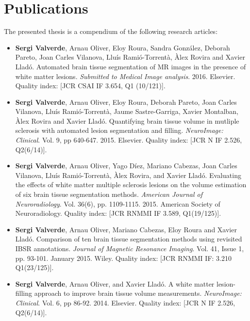 
\chapter*{Publications}


The presented thesis is a compendium of the following research articles:

\begin{itemize}

\item  \textbf{Sergi Valverde}, Arnau Oliver, Eloy Roura, Sandra Gonz\'{a}lez, Deborah Pareto, Joan Carles Vilanova, Llu\'{i}s Rami\'{o}-Torrent\`{a}, \`{A}lex Rovira and Xavier Llad\'{o}.  Automated brain tissue segmentation of MR images in the presence of white matter lesions. \textit{Submitted to Medical Image analysis}. 2016. Elsevier.  Quality index:  [JCR CSAI IF 3.654, Q1 (10/121)].

\item \textbf{Sergi Valverde}, Arnau Oliver, Eloy Roura, Deborah Pareto, Joan Carles Vilanova, Llu\'{i}s Rami\'{o}-Torrent\`{a}, Jaume Sastre-Garriga, Xavier Montalban, \`{A}lex Rovira and Xavier Llad\'{o}. Quantifying brain tissue volume in mutliple sclerosis with automated lesion segmentation and filling. \textit{NeuroImage: Clinical}. Vol. 9, pp 640-647. 2015. Elsevier.  Quality index:  [JCR N IF 2.526, Q2(6/14)].

\item  \textbf{Sergi Valverde}, Arnau Oliver, Yago D\'{i}ez, Mariano Cabezas, Joan Carles Vilanova, Llu\'{i}s Rami\'{o}-Torrent\`{a}, \`{A}lex Rovira, and Xavier Llad\'o. Evaluating the effects of white matter multiple sclerosis lesions on the volume estimation of six brain tissue segmentation methods. \textit{American Journal of Neuroradiology}. Vol. 36(6), pp. 1109-1115. 2015. American Society of Neuroradiology.  Quality index: [JCR RNMMI IF 3.589, Q1(19/125)].

\item \textbf{Sergi Valverde}, Arnau Oliver, Mariano Cabezas, Eloy Roura and Xavier Llad\'{o}. Comparison of ten brain tissue segmentation methods using revisited IBSR annotations. \textit{Journal of Magnetic Resonance Imaging}. Vol. 41, Issue 1, pp. 93-101. January 2015. Wiley.  Quality index: [JCR RNMMI IF: 3.210 Q1(23/125)].

\item  \textbf{Sergi Valverde}, Arnau Oliver, and Xavier Llad\'o. A white matter lesion-filling approach to improve brain tissue volume measurements. \textit{NeuroImage: Clinical}. Vol. 6, pp 86-92. 2014. Elsevier. Quality index: [JCR N IF 2.526, Q2(6/14)].

\end{itemize}


